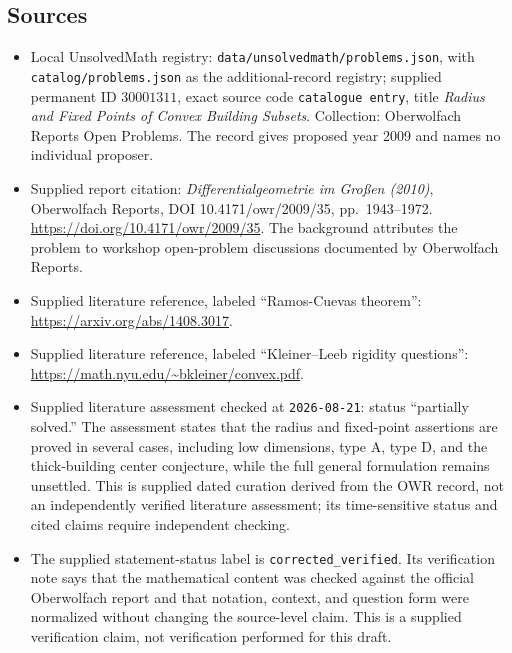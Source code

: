 \documentclass[11pt]{article}
\begin{document}
\subsection{Sources}
\begin{itemize}
\item Local UnsolvedMath registry: \texttt{data/unsolvedmath/problems.json}, with \texttt{catalog/problems.json} as the additional-record registry; supplied permanent ID \(30001311\), exact source code \texttt{catalogue entry}, title \emph{Radius and Fixed Points of Convex Building Subsets}. Collection: Oberwolfach Reports Open Problems. The record gives proposed year 2009 and names no individual proposer.
\item Supplied report citation: \emph{Differentialgeometrie im Großen (2010)}, Oberwolfach Reports, DOI 10.4171/owr/2009/35, pp.\ 1943--1972. \url{https://doi.org/10.4171/owr/2009/35}. The background attributes the problem to workshop open-problem discussions documented by Oberwolfach Reports.
\item Supplied literature reference, labeled ``Ramos-Cuevas theorem'': \url{https://arxiv.org/abs/1408.3017}.
\item Supplied literature reference, labeled ``Kleiner--Leeb rigidity questions'': \url{https://math.nyu.edu/~bkleiner/convex.pdf}.
\item Supplied literature assessment checked at \texttt{2026-08-21}: status ``partially solved.'' The assessment states that the radius and fixed-point assertions are proved in several cases, including low dimensions, type A, type D, and the thick-building center conjecture, while the full general formulation remains unsettled. This is supplied dated curation derived from the OWR record, not an independently verified literature assessment; its time-sensitive status and cited claims require independent checking.
\item The supplied statement-status label is \texttt{corrected\_verified}. Its verification note says that the mathematical content was checked against the official Oberwolfach report and that notation, context, and question form were normalized without changing the source-level claim. This is a supplied verification claim, not verification performed for this draft.
\end{itemize}
\end{document}
